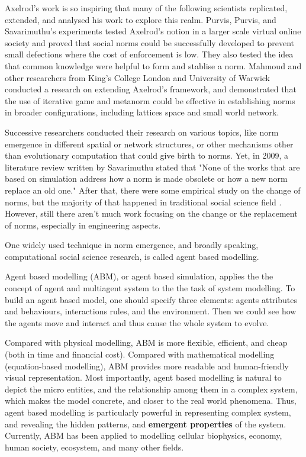 \documentclass[12pt]{extarticle}
\begin{document}
Axelrod's work is so inspiring that many of the following scientists replicated, extended, and analysed his work to explore this realm. Purvis, Purvis, and Savarimuthu's experiments\cite{Savarimuthu2008} tested Axelrod's notion in a larger scale virtual online society and proved that social norms could be successfully developed to prevent small defections where the cost of enforcement is low. They also tested the idea that common knowledge were helpful to form and stablise a norm. Mahmoud and other researchers from King's College London and University of Warwick conducted a research on extending Axelrod's framework\cite{mahmoud2017establishing}, and demonstrated that the use of iterative game and metanorm could be effective in establishing norms in broader configurations, including lattices space and small world network.

Successive researchers conducted their research on various topics, like norm emergence in different spatial or network structures\cite{burke2006emergence}\cite{10.1145/3127498}\cite{10.1007/978-981-10-2564-8_14}\cite{mahmoud2017establishing}, or other mechanisms other than evolutionary computation that could give birth to norms\cite{sen2007emergence}\cite{villatoro2011social}. Yet, in 2009, a literature review written by Savarimuthu\cite{Savarimuthu2011} stated that "None of the works that are based on simulation address how a norm is made obsolete or how a new norm replace an old one." After that, there were some empirical study on the change of norms, but the majority of that happened in traditional social science field\cite{Gest2013} \cite{Sandholtz2019}. However, still there aren't much work focusing on the change or the replacement of norms, especially in engineering aspects.

One widely used technique in norm emergence, and broadly speaking, computational social science research, is called agent based modelling. 

Agent based modelling (ABM), or agent based simulation, applies the the concept of agent and multiagent system to the the task of system modelling. To build an agent based model, one should specify three elements: agents attributes and behaviours, interactions rules, and the environment. Then we could see how the agents move and interact and thus cause the whole system to evolve.\cite{klugl2012agent}

Compared with physical modelling, ABM is more flexible, efficient, and cheap (both in time and financial cost). Compared with mathematical modelling (equation-based modelling), ABM provides more readable and human-friendly visual representation. Most importantly, agent based modelling is natural to depict the micro entities, and the relationship among them in a complex system, which makes the model concrete, and closer to the real world phenomena. Thus, agent based modelling is particularly powerful in representing complex system, and revealing the hidden patterns, and \textbf{emergent properties} of the system. Currently, ABM has been applied to modelling cellular biophysics\cite{bayrak2014agent}, economy\cite{arthur2006out}, human society\cite{an2012modeling}, ecosystem\cite{heckbert2010agent}, and many other fields.
\end{document}
